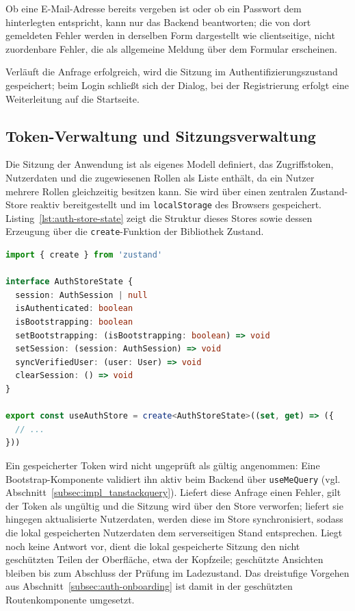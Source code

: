 Ob eine E-Mail-Adresse bereits vergeben ist oder ob ein Passwort dem
hinterlegten entspricht, kann nur das Backend beantworten; die von
dort gemeldeten Fehler werden in derselben Form dargestellt wie
clientseitige, nicht zuordenbare Fehler, die als allgemeine Meldung
über dem Formular erscheinen.

Verläuft die Anfrage erfolgreich, wird die Sitzung im
Authentifizierungszustand gespeichert; beim Login schließt sich der
Dialog, bei der Registrierung erfolgt eine Weiterleitung auf die
Startseite.

\subsection{Token-Verwaltung und Sitzungsverwaltung}
\label{subsec:impl_token_session}

Die Sitzung der Anwendung ist als eigenes Modell definiert, das
Zugriffstoken, Nutzerdaten und die zugewiesenen Rollen als Liste
enthält, da ein Nutzer mehrere Rollen gleichzeitig besitzen kann. Sie
wird über einen zentralen Zustand-Store reaktiv bereitgestellt und im
\texttt{localStorage} des Browsers gespeichert.
Listing~\ref{lst:auth-store-state} zeigt die Struktur dieses Stores
sowie dessen Erzeugung über die \texttt{create}-Funktion der
Bibliothek Zustand.

\begin{lstlisting}[language=TypeScript,caption={Struktur und Erzeugung des Auth-Stores (auth-store.ts)},label={lst:auth-store-state}]
import { create } from 'zustand'

interface AuthStoreState {
  session: AuthSession | null
  isAuthenticated: boolean
  isBootstrapping: boolean
  setBootstrapping: (isBootstrapping: boolean) => void
  setSession: (session: AuthSession) => void
  syncVerifiedUser: (user: User) => void
  clearSession: () => void
}

export const useAuthStore = create<AuthStoreState>((set, get) => ({
  // ...
}))
\end{lstlisting}

Ein gespeicherter Token wird nicht ungeprüft als gültig angenommen:
Eine Bootstrap-Komponente validiert ihn aktiv beim Backend über
\texttt{useMeQuery} (vgl.
Abschnitt~\ref{subsec:impl_tanstackquery}). Liefert diese Anfrage
einen Fehler, gilt der Token als ungültig und die Sitzung wird über
den Store verworfen; liefert sie hingegen aktualisierte Nutzerdaten,
werden diese im Store synchronisiert, sodass die lokal gespeicherten Nutzerdaten dem
serverseitigen Stand entsprechen. Liegt noch keine
Antwort vor, dient die lokal gespeicherte Sitzung den nicht
geschützten Teilen der Oberfläche, etwa der Kopfzeile; geschützte
Ansichten bleiben bis zum Abschluss der Prüfung im Ladezustand. Das dreistufige
Vorgehen aus Abschnitt~\ref{subsec:auth-onboarding} ist damit in der
geschützten Routenkomponente umgesetzt.

